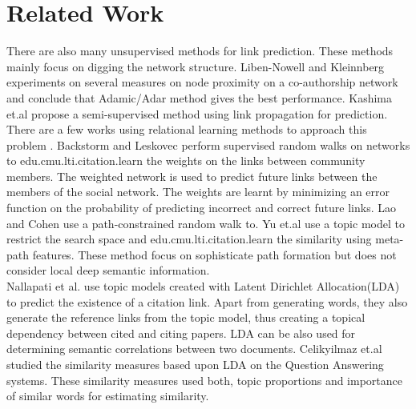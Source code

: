 \documentclass{article} %
\begin{document}
\section{Related Work}
There are also many unsupervised methods for link prediction.  These methods mainly focus on digging the network structure. Liben-Nowell and Kleinnberg \cite{Liben-Nowell2007} experiments on several measures on node proximity on a co-authorship network and conclude that Adamic/Adar method gives the best performance. Kashima et.al \cite{Kashima2009} propose a semi-supervised method using link propagation for prediction.\\
There are a few works using relational learning methods to approach this problem \cite{Taskar2003,Popescul2003}. Backstorm and Leskovec \cite{Backstrom:2011:SRW:1935826.1935914} perform supervised random walks on networks to edu.cmu.lti.citation.learn the weights on the links between community members. The weighted network is used to predict future links between the members of the social network. The weights are learnt by minimizing an error function on the probability of predicting incorrect and correct future links. Lao and Cohen \cite{Lao2010} use a path-constrained random walk to. Yu et.al \cite{Yu2012} use a topic model to restrict the search space and edu.cmu.lti.citation.learn the similarity using meta-path features. These method focus on sophisticate path formation but does not consider local deep semantic information. \\
Nallapati et al. \cite{nallapati2008joint} use topic models created with Latent Dirichlet Allocation(LDA) \cite{blei2003latent} to predict the existence of a citation link. Apart from generating words, they also generate the reference links from the topic model, thus creating a topical dependency between cited and citing papers. LDA can be also used for determining semantic correlations between two documents. Celikyilmaz et.al \cite{Celikyilmaz:2010:LBS:1867767.1867768} studied the similarity measures based upon LDA on the Question Answering systems. These similarity measures used both, topic proportions and importance of similar words for estimating similarity.\\
\end{document}
